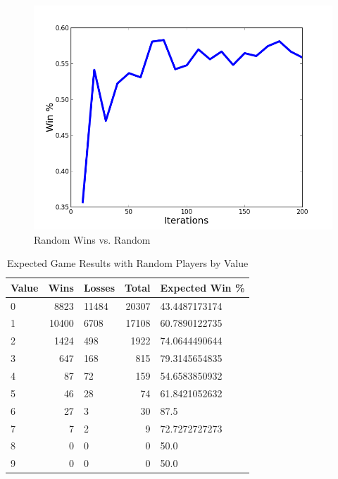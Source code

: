 \documentclass[12pt,pdftex]{article}
\begin{document}
\begin{figure}[hb!]
	\begin{center}
		\includegraphics[scale=0.5]{figs/randvrand.png}
		\caption{Random Wins vs. Random}
		\label{fig:rand_v_rand}
\end{center}
\end{figure}

\begin{table}[ht!]
\centering
\begin{tabular}{| l | r | l | r | l |}
	\hline
 \textbf{Value} & \textbf{Wins}& \textbf{Losses}& \textbf{Total}& \textbf{Expected Win \%}\\
\hline
0& 8823& 11484& 20307& 43.4487173174\\
1& 10400& 6708& 17108& 60.7890122735\\
2& 1424& 498& 1922& 74.0644490644\\
3& 647& 168& 815& 79.3145654835\\
4& 87& 72& 159& 54.6583850932\\
5& 46& 28& 74& 61.8421052632\\
6& 27& 3& 30& 87.5\\
7& 7& 2& 9& 72.7272727273\\
8& 0& 0& 0& 50.0\\
9& 0& 0& 0& 50.0\\
\hline
\end{tabular}
\caption{Expected Game Results with Random Players by Value}
\label{tab:rand_val_res}
\end{table}

\end{document}
